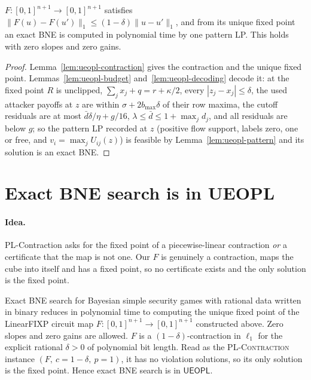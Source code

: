 \begin{theorem}\label{thm:sx-game}
\statusrefereed
$F:[0,1]^{n+1}\to[0,1]^{n+1}$ satisfies $\|F(u)-F(u')\|_1\le(1-\delta)\|u-u'\|_1$, and from its unique
fixed point an exact BNE is computed in polynomial time by one pattern LP. This holds with zero slopes
and zero gains.
\end{theorem}

\begin{proof}
Lemma~\ref{lem:ueopl-contraction} gives the contraction and the unique fixed point.
Lemmas~\ref{lem:ueopl-budget} and~\ref{lem:ueopl-decoding} decode it: at the fixed point $R$ is
unclipped, $\sum_jx_j+q=r+\kappa/2$, every $|z_j-x_j|\le\delta$, the used attacker payoffs at $z$ are
within $\sigma+2b_{\max}\delta$ of their row maxima, the cutoff residuals are at most
$\bar d\delta/\eta+g/16$, $\lambda\le\bar d\le1+\max_jd_j$, and all residuals are below $g$; so the
pattern LP recorded at $z$ (positive flow support, labels zero, one or free, and $v_i=\max_jU_{ij}(z)$)
is feasible by Lemma~\ref{lem:ueopl-pattern} and its solution is an exact BNE.
\end{proof}

\section{Exact BNE search is in UEOPL}\label{sec:ueopl}

\paragraph{Idea.} PL-Contraction asks for the fixed point of a piecewise-linear contraction \emph{or} a
certificate that the map is not one. Our $F$ is genuinely a contraction, maps the cube into itself and
has a fixed point, so no certificate exists and the only solution is the fixed point.

\begin{theorem}\label{thm:ueopl-main}
\statusrefereed
Exact BNE search for Bayesian simple security games with rational data written in binary reduces in
polynomial time to computing the unique fixed point of the LinearFIXP circuit map
$F:[0,1]^{n+1}\to[0,1]^{n+1}$ constructed above. Zero slopes and zero gains are allowed. $F$ is a
$(1-\delta)$-contraction in $\ell_1$ for the explicit rational $\delta>0$ of polynomial bit length.
Read as the \textnormal{\textsc{PL-Contraction}} instance $(F,\ c=1-\delta,\ p=1)$, it has no violation
solutions, so its only solution is the fixed point. Hence exact BNE search is in $\mathsf{UEOPL}$.
\end{theorem}

